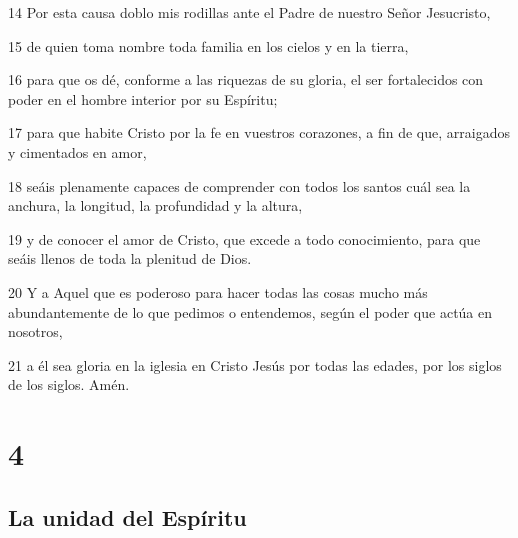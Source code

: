 \par 14 Por esta causa doblo mis rodillas ante el Padre de nuestro Señor Jesucristo,
\par 15 de quien toma nombre toda familia en los cielos y en la tierra,
\par 16 para que os dé, conforme a las riquezas de su gloria, el ser fortalecidos con poder en el hombre interior por su Espíritu;
\par 17 para que habite Cristo por la fe en vuestros corazones, a fin de que, arraigados y cimentados en amor,
\par 18 seáis plenamente capaces de comprender con todos los santos cuál sea la anchura, la longitud, la profundidad y la altura,
\par 19 y de conocer el amor de Cristo, que excede a todo conocimiento, para que seáis llenos de toda la plenitud de Dios.
\par 20 Y a Aquel que es poderoso para hacer todas las cosas mucho más abundantemente de lo que pedimos o entendemos, según el poder que actúa en nosotros,
\par 21 a él sea gloria en la iglesia en Cristo Jesús por todas las edades, por los siglos de los siglos. Amén.

\chapter{4}

\section*{La unidad del Espíritu}


